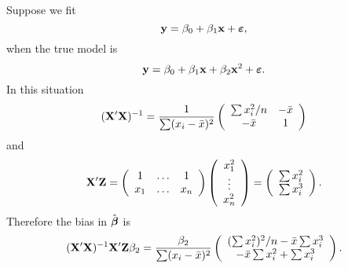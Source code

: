 \bexa
Suppose we fit $$\mathbf{y}=\beta_0+\beta_1\mathbf{x} +\mbox{\boldmath $\varepsilon$},$$ when the true model is $$\mathbf{y} = \beta_0 + \beta_1\mathbf{x} + \beta_2 \mathbf{x}^2 + \mbox{\boldmath $\varepsilon$}.$$
In this situation
$$
(\mathbf{X}'\mathbf{X})^{-1}=
{1\over \sum(x_i-\bar{x})^2}
\left(\begin{array}{cc}
	\sum x_i^2/n&-\bar{x}\\
	-\bar{x}&1
\end{array}\right)
$$
and
$$
\mathbf{X}'\mathbf{Z}
=\left(\begin{array}{ccc}1&\ldots&1\\x_1&\ldots&x_n\end{array}\right)
\left(\begin{array}{c}x_1^2\\\vdots\\x_n^2\end{array}\right)
=\left(\begin{array}{c}\sum x_i^2\\\sum x_i^3\end{array}\right).
$$
Therefore the bias in $\hat{\mbox{\boldmath $\beta$}}$ is
$$
(\mathbf{X}'\mathbf{X})^{-1}\mathbf{X}'\mathbf{Z}\beta_2
={\beta_2\over\sum(x_i-\bar{x})^2}
\left(\begin{array}{c}
	(\sum x_i^2)^2/n-\bar{x} \sum x_i^3 \\
	-\bar{x} \sum x_i^2 + \sum x_i^3
\end{array}\right).
$$
\eexa

